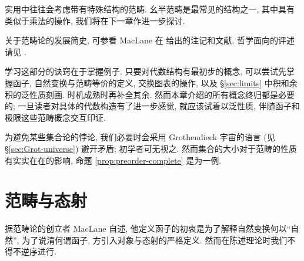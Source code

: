 实用中往往会考虑带有特殊结构的范畴. 幺半范畴是最常见的结构之一, 其中具有类似于乘法的操作, 我们将在下一章作进一步探讨.

关于范畴论的发展简史, 可参看 MacLane 在 \cite{ML98} 给出的注记和文献, 哲学面向的评述请见 \cite{sep-category-theory}.

\begin{wenxintishi}
	学习这部分的诀窍在于掌握例子. 只要对代数结构有最初步的概念, 可以尝试先掌握函子, 自然变换与范畴等价的定义, 交换图表的操作, 以及 \S\ref{sec:limits} 中积和余积的泛性质刻画. 时机成熟时再补全其余. 然而本章介绍的所有概念终归都是必要的; 一旦读者对具体的代数构造有了进一步感觉, 就应该试着以泛性质, 伴随函子和极限这些范畴概念交互印证.

	为避免某些集合论的悖论, 我们必要时会采用 Grothendieck 宇宙的语言 (见 \S\ref{sec:Grot-universe}) 避开矛盾; 初学者可无视之. 然而集合的大小对于范畴的性质有实实在在的影响, 命题 \ref{prop:preorder-complete} 是为一例.
\end{wenxintishi}

\section{范畴与态射}\label{sec:cat-and-morphism}
据范畴论的创立者 MacLane 自述, 他定义函子的初衷是为了解释自然变换何以``自然'', 为了说清何谓函子, 方引入对象与态射的严格定义. 然而在陈述理论时我们不得不逆序进行.

